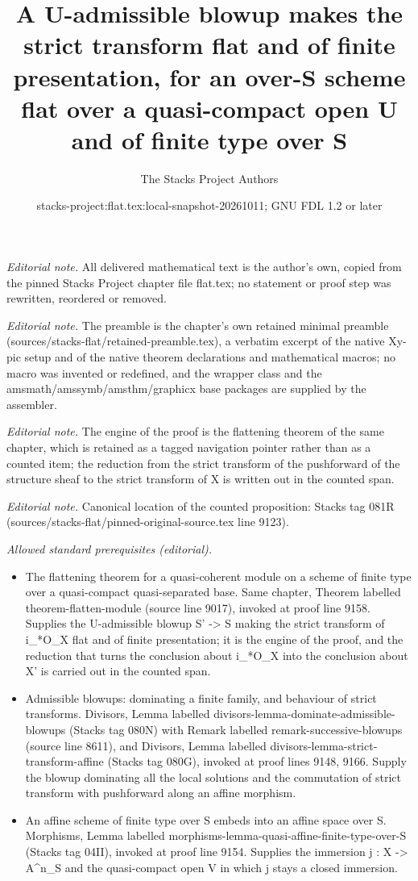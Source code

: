 \documentclass[10pt,a4paper]{amsart}
\title{A U-admissible blowup makes the strict transform flat and of finite presentation, for an over-S scheme flat over a quasi-compact open U and of finite type over S}
\author{The Stacks Project Authors}
\date{stacks-project:flat.tex:local-snapshot-20261011; GNU FDL 1.2 or later}
\theoremstyle{plain}
\theoremstyle{definition}
\theoremstyle{remark}
\numberwithin{equation}{subsection}
\begin{document}
\maketitle
\noindent\textit{Editorial note.} All delivered mathematical text is the author's own, copied from the pinned Stacks Project chapter file flat.tex; no statement or proof step was rewritten, reordered or removed.\par\medskip
\noindent\textit{Editorial note.} The preamble is the chapter's own retained minimal preamble (sources/stacks-flat/retained-preamble.tex), a verbatim excerpt of the native Xy-pic setup and of the native theorem declarations and mathematical macros; no macro was invented or redefined, and the wrapper class and the amsmath/amssymb/amsthm/graphicx base packages are supplied by the assembler.\par\medskip
\noindent\textit{Editorial note.} The engine of the proof is the flattening theorem of the same chapter, which is retained as a tagged navigation pointer rather than as a counted item; the reduction from the strict transform of the pushforward of the structure sheaf to the strict transform of X is written out in the counted span.\par\medskip
\noindent\textit{Editorial note.} Canonical location of the counted proposition: Stacks tag 081R (sources/stacks-flat/pinned-original-source.tex line 9123).\par\medskip
\noindent\textit{Allowed standard prerequisites (editorial).}\begin{itemize}
\item The flattening theorem for a quasi-coherent module on a scheme of finite type over a quasi-compact quasi-separated base. Same chapter, Theorem labelled theorem-flatten-module (source line 9017), invoked at proof line 9158. Supplies the U-admissible blowup S' -> S making the strict transform of i\_*O\_X flat and of finite presentation; it is the engine of the proof, and the reduction that turns the conclusion about i\_*O\_X into the conclusion about X' is carried out in the counted span.
\item Admissible blowups: dominating a finite family, and behaviour of strict transforms. Divisors, Lemma labelled divisors-lemma-dominate-admissible-blowups (Stacks tag 080N) with Remark labelled remark-successive-blowups (source line 8611), and Divisors, Lemma labelled divisors-lemma-strict-transform-affine (Stacks tag 080G), invoked at proof lines 9148, 9166. Supply the blowup dominating all the local solutions and the commutation of strict transform with pushforward along an affine morphism.
\item An affine scheme of finite type over S embeds into an affine space over S. Morphisms, Lemma labelled morphisms-lemma-quasi-affine-finite-type-over-S (Stacks tag 04II), invoked at proof line 9154. Supplies the immersion j : X -> A\textasciicircum{}n\_S and the quasi-compact open V in which j stays a closed immersion.
\end{itemize}\medskip
\end{document}
